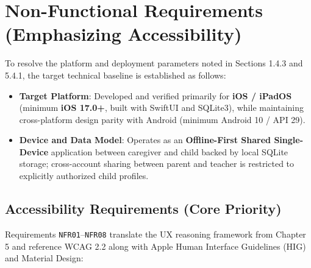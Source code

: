 \section{Non-Functional Requirements (Emphasizing Accessibility)}


To resolve the platform and deployment parameters noted in Sections 1.4.3 and 5.4.1, the target technical baseline is established as follows:
\begin{itemize}
  \item \textbf{Target Platform}: Developed and verified primarily for \textbf{iOS / iPadOS} (minimum \textbf{iOS 17.0+}, built with SwiftUI and SQLite3), while maintaining cross-platform design parity with Android (minimum Android 10 / API 29).
  \item \textbf{Device and Data Model}: Operates as an \textbf{Offline-First Shared Single-Device} application between caregiver and child backed by local SQLite storage; cross-account sharing between parent and teacher is restricted to explicitly authorized child profiles.
\end{itemize}



\subsection{Accessibility Requirements (Core Priority)}


Requirements \texttt{NFR01}–\texttt{NFR08} translate the UX reasoning framework from Chapter 5 and reference WCAG 2.2 along with Apple Human Interface Guidelines (HIG) and Material Design:

